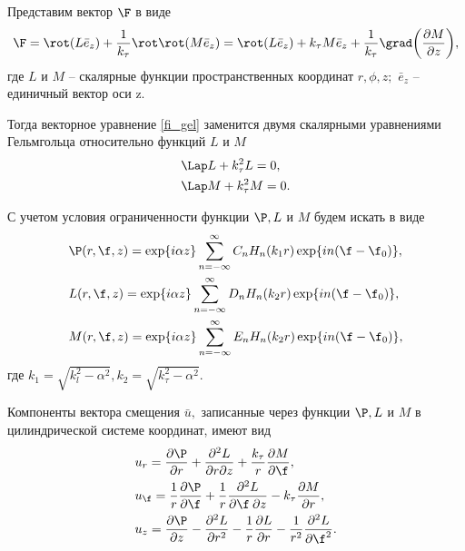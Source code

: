 Представим вектор $\F$ в виде
$$\F=\rot(L\bar{e}_z)+\frac1{k_\tau}\rot\rot(M\bar{e}_z)=\rot(L\bar{e}_z)+k_\tau M\bar{e}_z+\frac1{k_\tau}\grad\biggl(\frac{\partial M}{\partial z}\biggr),$$
где $L$ и $M$ -- скалярные функции пространственных координат $r, \phi, z;$ $\bar{e}_z$ -- единичный вектор оси z.

Тогда векторное уравнение \eqref{fi_gel} заменится двумя скалярными уравнениями Гельмгольца относительно функций $L$ и $M$
\begin{align*}
&\Lap L+k_{\tau}^2L=0,\\
&\Lap M+k_{\tau}^2M=0.
\end{align*}

С учетом условия ограниченности функции $\P, L$ и $M$ будем искать в виде
\begin{align}
&\P(r, \f, z)= \exp\{i\alpha z\}\sum_{n=-\infty}^{\infty}C_nH_n(k_1 r)\exp\{in(\f-\f_0)\},\\
&L(r, \f, z)= \exp\{i\alpha z\}\sum_{n=-\infty}^{\infty}D_nH_n(k_2 r)\exp\{in(\f-\f_0)\},\\
&M(r, \f, z)= \exp\{i\alpha z\}\sum_{n=-\infty}^{\infty}E_nH_n(k_2 r)\exp\{in(\f-\f_0)\},
\end{align}
где $k_1=\sqrt{k_l^2-\alpha^2}, k_2=\sqrt{k_{\tau}^2-\alpha^2}.$

Компоненты вектора смещения $\bar{u},$ записанные через функции $\P, L$ и $M$ в цилиндрической системе координат, имеют вид
\begin{align}
&u_r=\frac{\partial \P}{\partial r}+\frac{\partial^2 L}{\partial r\partial z}+\frac{k_\tau} {r}\frac{\partial M}{\partial \f},\\
&u_\f=\frac{1}{r}\frac{\partial \P}{\partial \f}+\frac{1}{r}\frac{\partial^{2} L}{\partial\f\: \partial z}-k_{\tau}\frac{\partial M}{\partial r},\\
&u_z=\frac{\partial\P}{\partial z}-\frac{\partial^{2} L}{\partial r^{2}}-\frac{1}{r}\frac{\partial L}{\partial r}-\frac{1}{r^2}\frac{\partial^{2}L}{\partial\f^{2}}.
\end{align}

